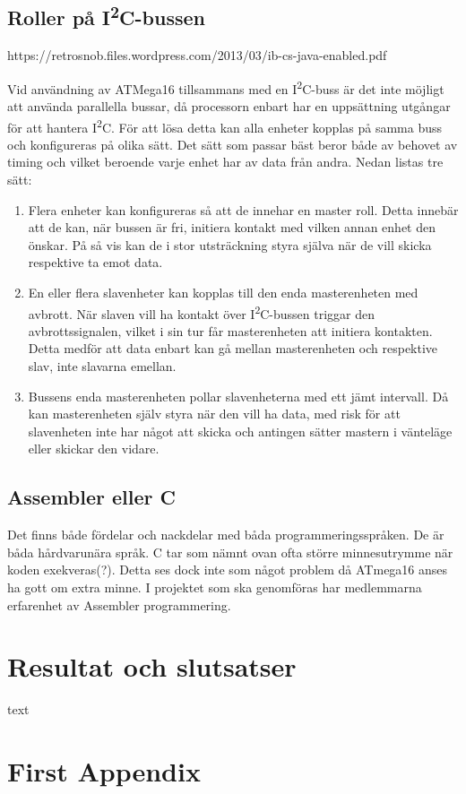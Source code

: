 \documentclass[11pt]{article}
\begin{document}
\begin{flushleft}
\subsection{Roller på I\textsuperscript{2}C-bussen}
https://retrosnob.files.wordpress.com/2013/03/ib-cs-java-enabled.pdf 

Vid användning av ATMega16 tillsammans med en I\textsuperscript{2}C-buss är det inte möjligt att använda parallella bussar, då processorn enbart har en uppsättning utgångar för att hantera I\textsuperscript{2}C. För att lösa detta kan alla enheter kopplas på samma buss och konfigureras på olika sätt. Det sätt som passar bäst beror både av behovet av timing och vilket beroende varje enhet har av data från andra. Nedan listas tre sätt:

\begin{enumerate}
 \item Flera enheter kan konfigureras så att de innehar en master roll. Detta innebär att de kan, när bussen är fri, initiera kontakt med vilken annan enhet den önskar. På så vis kan de i stor utsträckning styra själva när de vill skicka respektive ta emot data.
 
 \item En eller flera slavenheter kan kopplas till den enda masterenheten med avbrott. När slaven vill ha kontakt över I\textsuperscript{2}C-bussen triggar den avbrottssignalen, vilket i sin tur får masterenheten att initiera kontakten. Detta medför att data enbart kan gå mellan masterenheten och respektive slav, inte slavarna emellan.
 
 \item Bussens enda masterenheten pollar slavenheterna med ett jämt intervall. Då kan masterenheten själv styra när den vill ha data, med risk för att slavenheten inte har något att skicka och antingen sätter mastern i vänteläge eller skickar den vidare.
\end{enumerate}

\subsection{Assembler eller C}

Det finns både fördelar och nackdelar med båda programmeringsspråken. De är båda hårdvarunära språk. C tar som nämnt ovan ofta större minnesutrymme när koden exekveras(?). Detta ses dock inte som något problem då ATmega16 anses ha gott om extra minne.
I projektet som ska genomföras har medlemmarna erfarenhet av Assembler programmering. 
\pagebreak

\section{Resultat och slutsatser}
text

\pagebreak
{}



\pagebreak
\appendix
\section{First Appendix}

\end{flushleft}
\end{document}
